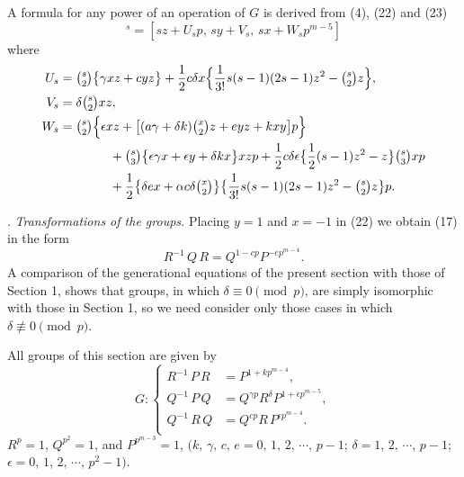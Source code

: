 \documentclass[oneside]{article}
\begin{document}
A formula for any power of an operation of $G$ is derived from (4),
(22) and (23)
\begin{equation}
[z,\, y,\, x]^s = [sz + U_s p,\, sy + V_s,\, sx + W_s p^{m-5}] %
\end{equation}
\noindent where
\begin{align*}
U_s &= \tbinom{s}{2}\bigl\{\gamma xz + cyz\bigr\} + \frac{1}{2}c\delta x
   \Bigl\{\frac{1}{3!}s(s - 1)(2s - 1)z^2 - \tbinom{s}{2}z\Bigr\}, \\
V_s &= \delta \tbinom{s}{2}xz, \\
W_s &= \tbinom{s}{2} \Bigl\{\epsilon xz + \bigl[(a\gamma + \delta k)\tbinom{x}{2}z + eyz + kxy\bigr]p\Bigr\} \\
   & \qquad \qquad + \tbinom{s}{3}\bigl\{\epsilon \gamma x + \epsilon y + \delta kx \bigr\}xzp
      + \frac{1}{2}c \delta \epsilon \bigl\{\frac{1}{2}(s - 1)z^2 - z\bigr\} \tbinom{s}{3}xp \\
   & \qquad \qquad + \frac{1}{2}\bigl\{\delta ex + \alpha c \delta \tbinom{x}{2}\bigr\}
      \bigl\{\frac{1}{3!}s(s - 1)(2s - 1)z^2 - \tbinom{s}{2}z\bigr\}p.
\end{align*}

. \textit{Transformations of the groups.} Placing $y = 1$ and $x = -1$ in (22)
we obtain (17) in the form
\begin{equation*}
R^{-1}\, Q\, R = Q^{1-cp} P^{-ep^{m-4}}.
\end{equation*}
\noindent A comparison of the generational equations of the present section with
those of Section 1, shows that groups, in which $\delta \equiv 0 \pmod{p}$,
are simply isomorphic with those in Section 1, so we need consider only
those cases in which $\delta \not\equiv 0 \pmod{p}$.

All groups of this section are given by
\begin{equation*}
G: \left\{ \begin{aligned}
                R^{-1}\, P\, R &= P^{1 + kp^{m-4}}, \\
                Q^{-1}\, P\, Q &= Q^{\gamma p} R^\delta P^{1 + \epsilon p^{m-5}}, \\
                Q^{-1}\, R\, Q &= Q^{cp} R\, P^{\epsilon p^{m-4}}. \\ \end{aligned}
\right. \tag*{(25), (26), (27)}
\end{equation*}
\noindent $R^p = 1$, $Q^{p^2} = 1$, and $P^{p^{m-3}} = 1$, $(k,\, \gamma,\, c,\, e = 0,\, 1,\,
2,\, \cdots ,\, p - 1$; $\delta = 1,\, 2,\, \cdots,\, p - 1$; $\epsilon = 0,\, 1,\, 2,\, \cdots,\,
p^2 - 1)$.
\end{document}
